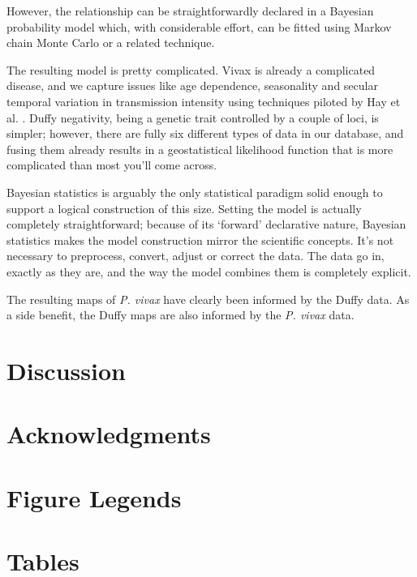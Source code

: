 \documentclass[10pt]{article}
\begin{document}
However, the relationship can be straightforwardly declared in a Bayesian probability model which, with considerable effort, can be fitted using Markov chain Monte Carlo or a related technique.

The resulting model is pretty complicated. Vivax is already a complicated disease, and we capture issues like age dependence, seasonality and secular temporal variation in transmission intensity using techniques piloted by Hay et al. \cite{hay2008}. Duffy negativity, being a genetic trait controlled by a couple of loci, is simpler; however, there are fully six different types of data in our database, and fusing them already results in a geostatistical likelihood function that is more complicated than most you'll come across. 

Bayesian statistics is arguably the only statistical paradigm solid enough to support a logical construction of this size. Setting the model is actually completely straightforward; because of its `forward' declarative nature, Bayesian statistics makes the model construction mirror the scientific concepts. It's not necessary to preprocess, convert, adjust or correct the data. The data go in, exactly as they are, and the way the model combines them is completely explicit.

The resulting maps of \emph{P. vivax} have clearly been informed by the Duffy data. As a side benefit, the Duffy maps are also informed by the \emph{P. vivax} data.


 

\section*{Discussion}


\section*{Acknowledgments}




\section*{Figure Legends}


\section*{Tables}
\end{document}
